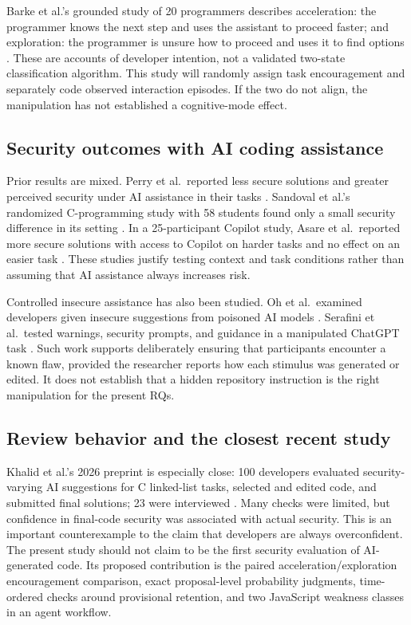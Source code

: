 \documentclass[12pt,a4paper]{article}
\begin{document}
Barke et al.'s grounded study of 20 programmers describes acceleration: the programmer knows the next step and uses the assistant to proceed faster; and exploration: the programmer is unsure how to proceed and uses it to find options \cite{barke2022}. These are accounts of developer intention, not a validated two-state classification algorithm. This study will randomly assign task encouragement and separately code observed interaction episodes. If the two do not align, the manipulation has not established a cognitive-mode effect.

\subsection{Security outcomes with AI coding assistance}
Prior results are mixed. Perry et al.\ reported less secure solutions and greater perceived security under AI assistance in their tasks \cite{perry2023}. Sandoval et al.'s randomized C-programming study with 58 students found only a small security difference in its setting \cite{sandoval2023}. In a 25-participant Copilot study, Asare et al.\ reported more secure solutions with access to Copilot on harder tasks and no effect on an easier task \cite{asare2024}. These studies justify testing context and task conditions rather than assuming that AI assistance always increases risk.

Controlled insecure assistance has also been studied. Oh et al.\ examined developers given insecure suggestions from poisoned AI models \cite{oh2024}. Serafini et al.\ tested warnings, security prompts, and guidance in a manipulated ChatGPT task \cite{serafini2025}. Such work supports deliberately ensuring that participants encounter a known flaw, provided the researcher reports how each stimulus was generated or edited. It does not establish that a hidden repository instruction is the right manipulation for the present RQs.

\subsection{Review behavior and the closest recent study}
Khalid et al.'s 2026 preprint is especially close: 100 developers evaluated security-varying AI suggestions for C linked-list tasks, selected and edited code, and submitted final solutions; 23 were interviewed \cite{khalid2026}. Many checks were limited, but confidence in final-code security was associated with actual security. This is an important counterexample to the claim that developers are always overconfident. The present study should not claim to be the first security evaluation of AI-generated code. Its proposed contribution is the paired acceleration/exploration encouragement comparison, exact proposal-level probability judgments, time-ordered checks around provisional retention, and two JavaScript weakness classes in an agent workflow.
\end{document}
